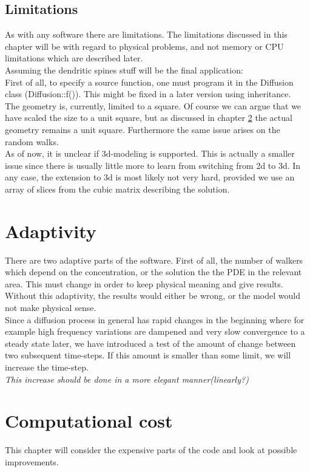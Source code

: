 \subsection{Limitations}

As with any software there are limitations. The limitations discussed in this chapter will be with regard to physical problems, and not memory or CPU limitations which are described later. \\
Assuming the dendritic spines stuff will be the final application:\\
First of all, to specify a source function, one must program it in the Diffusion class (Diffusion::f()). This might be fixed in a later version using inheritance.\\
The geometry is, currently, limited to a square. Of course we can argue that we have scaled the size to a unit square, but as discussed in chapter \ref{} the actual geometry remains a unit square. 
Furthermore the same issue arises on the random walks. \\
As of now, it is unclear if 3d-modeling is supported. This is actually a smaller issue since there is usually little more to learn from switching from 2d to 3d. In any case, the extension to 3d is most likely not very hard, provided we use an array of slices from the cubic matrix describing the solution.

\section{Adaptivity}

There are two adaptive parts of the software. First of all, the number of walkers which depend on the concentration, or the solution the the PDE in the relevant area. This must change in order to keep physical meaning and give results. Without this adaptivity, the results would either be wrong, or the model would not make physical sense.\\
Since a diffusion process in general has rapid changes in the beginning where for example high frequency variations are dampened and very slow convergence to a steady state later, we have introduced a test of the amount of change between two subsequent time-steps. If this amount is smaller than some limit, we will increase the time-step.\\
\emph{This increase should be done in a more elegant manner(linearly?)}

\section{Computational cost}
This chapter will consider the expensive parts of the code and look at possible improvements.

